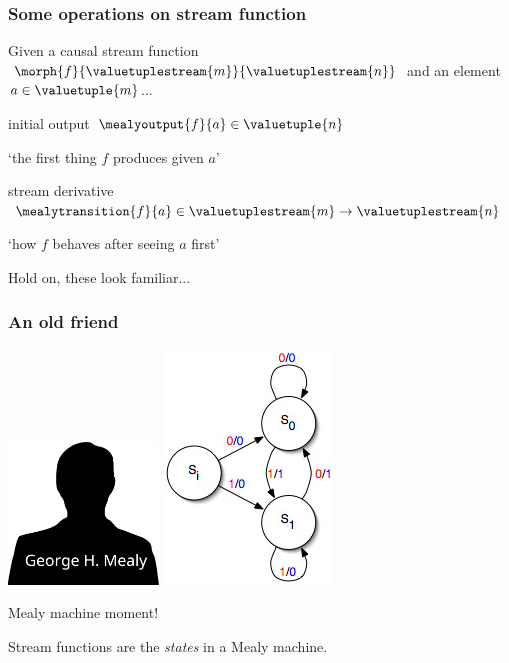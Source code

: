 \begin{frame}
    \frametitle{Some operations on stream function}

    Given a causal stream function \(
        \morph{f}{\valuetuplestream{m}}{\valuetuplestream{n}}
    \) and an element \(a \in \valuetuple{m}\)...

    \wait

    \Large
    \alert{initial output} \quad
    \(\mealyoutput{f}{a} \in \valuetuple{n}\)

    \wait

    \normalsize
    `the first thing \(f\) produces given \(a\)'

    \wait

    \Large
    \alert{stream derivative} \quad
    \(\mealytransition{f}{a} \in \valuetuplestream{m} \to \valuetuplestream{n}\)

    \wait

    \normalsize
    `how \(f\) behaves after seeing \(a\) first'

    \vspace{1em}

    \wait
    Hold on, these look familiar...

\end{frame}
\begin{frame}
    \frametitle{An old friend}

    \Large

    \begin{center}
        \includegraphics[width=0.3\textwidth]{imgs/mealy}
        \quad
        \includegraphics[scale=0.5]{imgs/mealy-machine}

        Mealy machine moment!

        \wait

        \normalsize
        Stream functions are the \emph{states} in a Mealy machine.
    \end{center}

\end{frame}
